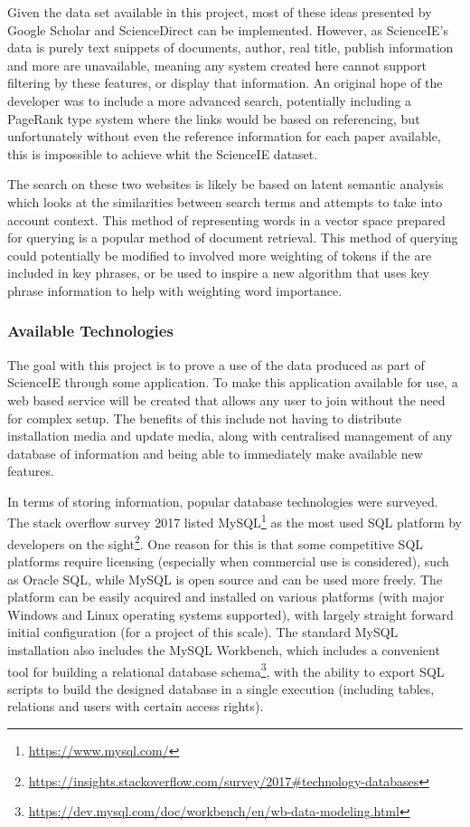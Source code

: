Given the data set available in this project, most of these ideas presented by Google Scholar and ScienceDirect can be implemented. However, as ScienceIE's data is purely text snippets of documents, author, real title, publish information and more are unavailable, meaning any system created here cannot support filtering by these features, or display that information. An original hope of the developer was to include a more advanced search, potentially including a PageRank type system \cite{Page1998} where the links would be based on referencing, but unfortunately without even the reference information for each paper available, this is impossible to achieve whit the ScienceIE dataset.

The search on these two websites is likely be based on latent semantic analysis \cite{Landauer1998,AswaniKumar2012} which looks at the similarities between search terms and attempts to take into account context. This method of representing words in a vector space prepared for querying is a popular method of document retrieval. This method of querying could potentially be modified to involved more weighting of tokens if the are included in key phrases, or be used to inspire a new algorithm that uses key phrase information to help with weighting word importance.

\subsubsection*{Available Technologies}
The goal with this project is to prove a use of the data produced as part of ScienceIE through some application. To make this application available for use, a web based service will be created that allows any user to join without the need for complex setup. The benefits of this include not having to distribute installation media and update media, along with centralised management of any database of information and being able to immediately make available new features.

In terms of storing information, popular database technologies were surveyed. The stack overflow survey 2017 listed MySQL\footnote{\href{https://www.mysql.com/}{https://www.mysql.com/}} as the most used SQL platform by developers on the sight\footnote{\href{https://insights.stackoverflow.com/survey/2017\#technology-databases}{https://insights.stackoverflow.com/survey/2017\#technology-databases}}. One reason for this is that some competitive SQL platforms require licensing (especially when commercial use is considered), such as Oracle SQL, while MySQL is open source and can be used more freely. The platform can be easily acquired and installed on various platforms (with major Windows and Linux operating systems supported), with largely straight forward initial configuration (for a project of this scale). The standard MySQL installation also includes the MySQL Workbench, which includes a convenient tool for building a relational database schema\footnote{\href{https://dev.mysql.com/doc/workbench/en/wb-data-modeling.html}{https://dev.mysql.com/doc/workbench/en/wb-data-modeling.html}}, with the ability to export SQL scripts to build the designed database in a single execution (including tables, relations and users with certain access rights). 

